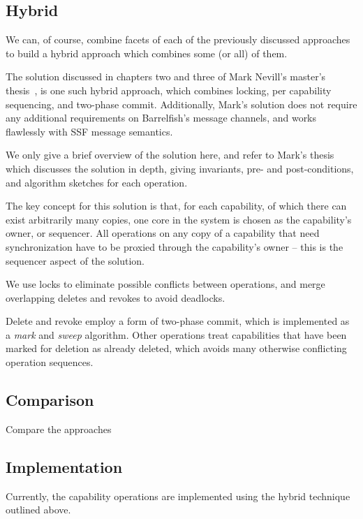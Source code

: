 \documentclass[a4paper,twoside]{report} %
\begin{document}
\subsection{Hybrid}

We can, of course, combine facets of each of the previously discussed
approaches to build a hybrid approach which combines some (or all) of them.

The solution discussed in chapters two and three of Mark Nevill's master's
thesis~\cite{Nevill2012}, is one such hybrid approach, which combines locking,
per capability sequencing, and two-phase commit.
Additionally, Mark's solution does not require any additional requirements on
Barrelfish's message channels, and works flawlessly with SSF message
semantics.

We only give a brief overview of the solution here, and refer to Mark's thesis
which discusses the solution in depth, giving invariants, pre- and
post-conditions, and algorithm sketches for each operation.

The key concept for this solution is that, for each capability, of which there
can exist arbitrarily many copies, one core in the system is chosen as the
capability's owner, or sequencer.
All operations on any copy of a capability that need synchronization have to
be proxied through the capability's owner -- this is the sequencer aspect of
the solution.

We use locks to eliminate possible conflicts between operations, and merge
overlapping deletes and revokes to avoid deadlocks.

Delete and revoke employ a form of two-phase commit, which is implemented as a
\emph{mark} and \emph{sweep} algorithm.
Other operations treat capabilities that have been marked for deletion as
already deleted, which avoids many otherwise conflicting operation sequences.

\subsection{Comparison}
Compare the approaches

\subsection{Implementation}

Currently, the capability operations are implemented using the hybrid
technique outlined above.

\end{document}
